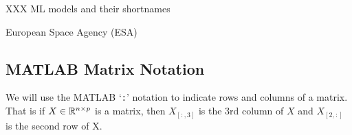 XXX ML models and their shortnames

European Space Agency (ESA)

\subsection*{MATLAB Matrix Notation}{ \label{sec:MATLAB}
		We will use the MATLAB `\texttt{:}' notation to indicate rows and columns of a matrix. That is if $X\in\mathbb{R}^{n\times p}$ is a matrix, then $X_{[:,3]}$ is the $3$rd column of $X$ and $X_{[2,:]}$ is the second row of X. 
}


